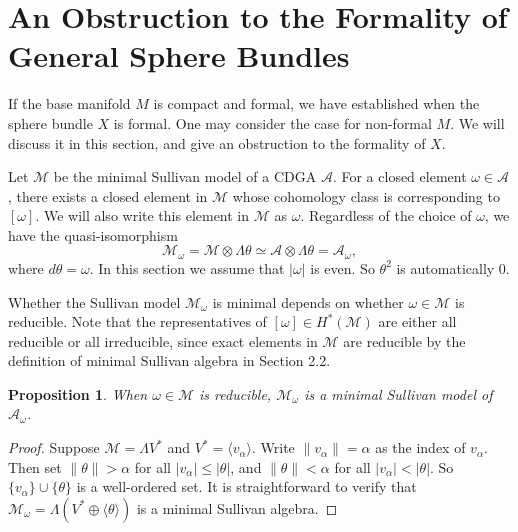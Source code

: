 \documentclass{article}
\theoremstyle{plain}
\newtheorem{prop}[thm]{Proposition}
\theoremstyle{definition}
\theoremstyle{plain}
\numberwithin{equation}{section}
\begin{document}
\section{An Obstruction to the Formality of General Sphere Bundles}

If the base manifold $M$ is compact and formal, we have established when the sphere bundle $X$ is formal. One may consider the case for non-formal $M$. We will discuss it in this section, and give an obstruction to the formality of $X$.

Let $\mathcal{M}$ be the minimal Sullivan model of a CDGA $\mathcal{A}$. For a closed element $\omega\in\mathcal{A}$, there exists a closed element in $\mathcal{M}$ whose cohomology class is corresponding to $[\omega]$. We will also write this element in $\mathcal{M}$ as $\omega$. Regardless of the choice of $\omega$, we have the quasi-isomorphism
$$
\mathcal{M}_{\omega}= \mathcal{M}\otimes\Lambda \theta \simeq \mathcal{A}\otimes\Lambda \theta = \mathcal{A}_{\omega},
$$
where $d\theta=\omega$. In this section we assume that $|\omega|$ is even. So $\theta^2$ is automatically 0.

Whether the Sullivan model $\mathcal{M}_{\omega}$ is minimal depends on whether $\omega\in\mathcal{M}$ is reducible. Note that the representatives of $[\omega]\in H^*(\mathcal{M})$ are either all reducible or all irreducible, since exact elements in $\mathcal{M}$ are reducible by the definition of minimal Sullivan algebra in Section 2.2.

\begin{prop}
When $\omega\in\mathcal{M}$ is reducible, $\mathcal{M}_{\omega}$ is a minimal Sullivan model of $\mathcal{A}_{\omega}$.
\end{prop}
\begin{proof}
Suppose $\mathcal{M}=\Lambda V^*$ and $V^*=\langle v_{\alpha}\rangle$. Write $\|v_{\alpha}\|=\alpha$ as the index of $v_{\alpha}$. Then set $\|\theta\|>\alpha$ for all $|v_{\alpha}|\leq|\theta|$, and $\|\theta\|<\alpha$ for all $|v_{\alpha}|<|\theta|$. So $\{v_{\alpha}\}\cup\{\theta\}$ is a well-ordered set. It is straightforward to verify that $\mathcal{M}_{\omega}=\Lambda(V^*\oplus \langle\theta\rangle)$ is a minimal Sullivan algebra.
\end{proof}
\end{document}
